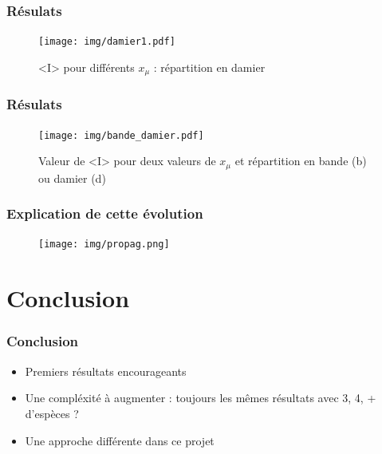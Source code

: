 \documentclass[handout]{beamer}
\begin{document}
\begin{frame}
	\frametitle{Résulats}
\begin{figure}[!h]
\centering
	\texttt{[image: img/damier1.pdf]}
	\caption{<I> pour différents $x_\mu$ : répartition en damier}
\end{figure}
\end{frame}

\begin{frame}
	\frametitle{Résulats}
\begin{figure}[!h]
\centering
	\texttt{[image: img/bande\_damier.pdf]}
	\caption{Valeur de <I> pour deux valeurs de $x_\mu$ et répartition en bande (b) ou damier (d)}
\end{figure}
\end{frame}

\begin{frame}
	\frametitle{Explication de cette évolution}
\begin{figure}[!h]
\centering
	\texttt{[image: img/propag.png]}
\end{figure}
\end{frame}

\section*{Conclusion}

\begin{frame}
	\frametitle{Conclusion}
\begin{itemize}
	\item Premiers résultats encourageants
	\item Une compléxité à augmenter : toujours les mêmes résultats avec 3, 4, + d'espèces ?
	\item Une approche différente dans ce projet
\end{itemize}
\end{frame}
\end{document}
